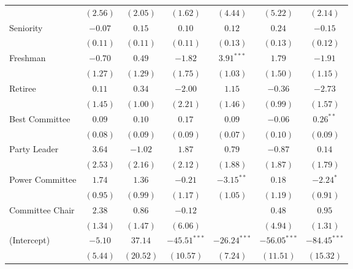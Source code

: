 \documentclass[12pt]{article}
\begin{document}
\begin{table}
\begin{center}
\begin{tabular}{l c c c c c c }
			& $(2.56)$      & $(2.05)$      & $(1.62)$       & $(4.44)$       & $(5.22)$       & $(2.14)$       \\
			Seniority                 & $-0.07$       & $0.15$        & $0.10$         & $0.12$         & $0.24$         & $-0.15$        \\
			& $(0.11)$      & $(0.11)$      & $(0.11)$       & $(0.13)$       & $(0.13)$       & $(0.12)$       \\
			Freshman                  & $-0.70$       & $0.49$        & $-1.82$        & $3.91^{***}$   & $1.79$         & $-1.91$        \\
			& $(1.27)$      & $(1.29)$      & $(1.75)$       & $(1.03)$       & $(1.50)$       & $(1.15)$       \\
			Retiree                     & $0.11$        & $0.34$        & $-2.00$        & $1.15$         & $-0.36$        & $-2.73$        \\
			& $(1.45)$      & $(1.00)$      & $(2.21)$       & $(1.46)$       & $(0.99)$       & $(1.57)$       \\
			Best Committee               & $0.09$        & $0.10$        & $0.17$         & $0.09$         & $-0.06$        & $0.26^{**}$    \\
			& $(0.08)$      & $(0.09)$      & $(0.09)$       & $(0.07)$       & $(0.10)$       & $(0.09)$       \\
			Party Leader                    & $3.64$        & $-1.02$       & $1.87$         & $0.79$         & $-0.87$        & $0.14$         \\
			& $(2.53)$      & $(2.16)$      & $(2.12)$       & $(1.88)$       & $(1.87)$       & $(1.79)$       \\
			Power Committee                     & $1.74$        & $1.36$        & $-0.21$        & $-3.15^{**}$   & $0.18$         & $-2.24^{*}$    \\
			& $(0.95)$      & $(0.99)$      & $(1.17)$       & $(1.05)$       & $(1.19)$       & $(0.91)$       \\
			Committee Chair                     & $2.38$        & $0.86$        & $-0.12$        &                & $0.48$         & $0.95$         \\
			& $(1.34)$      & $(1.47)$      & $(6.06)$       &                & $(4.94)$       & $(1.31)$       \\
			(Intercept)                 & $-5.10$       & $37.14$       & $-45.51^{***}$ & $-26.24^{***}$ & $-56.05^{***}$ & $-84.45^{***}$ \\
						& $(5.44)$      & $(20.52)$     & $(10.57)$      & $(7.24)$       & $(11.51)$      & $(15.32)$      \\

\end{tabular}
\end{center}
\end{table}
\end{document}
